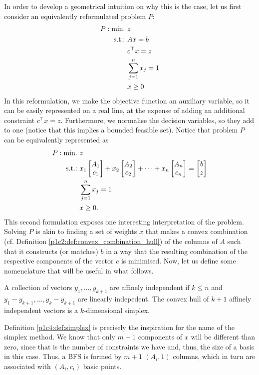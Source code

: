 In order to develop a geometrical intuition on why this is the case, let us first consider an equivalently reformulated problem $P$:
%
\begin{align*}
	P : \mathop{\text{min.~}} & z           \\
	\mathop{\text{s.t.:~}} & Ax = b        \\
	& c^\top x = z      \\	
	& \sum_{j=1}^nx_j=1 \\
	& x \geq 0
\end{align*}
% 
In this reformulation, we make the objective function an auxiliary variable, so it can be easily represented on a real line, at the expense of adding an additional constraint $c^\top x = z$. Furthermore, we normalise the decision variables, so they add to one (notice that this implies a bounded feasible set). Notice that problem $P$ can be equivalently represented as  
%
\begin{align*}
	P : \mathop{\text{min.~}} & z     \\
	\mathop{\text{s.t.:~}} & x_1\begin{bmatrix}
		A_1 \\
		c_1
	\end{bmatrix} + x_2\begin{bmatrix}
		A_2 \\
		c_2
	\end{bmatrix} + \dots +
	x_n\begin{bmatrix}
		A_n \\
		c_n
	\end{bmatrix} = \begin{bmatrix}
		b \\
		z
	\end{bmatrix}\\
	& \sum_{j=1}^nx_j=1 \\
	& x \geq 0.
\end{align*}
% 
This second formulation exposes one interesting interpretation of the problem. Solving $P$ is akin to finding a set of weights $x$ that makes a convex combination (cf. Definition \ref{p1c2:def:convex_combination_hull}) of the columns of $A$ such that it constructs (or matches) $b$ in a way that the resulting combination of the respective components of the vector $c$ is minimised. Now, let us define some nomenclature that will be useful in what follows.
%
\begin{definition} \label{p1c4:def:simplex}
	A collection of vectors $y_1, \dots, y_{k+1}$ are affinely independent if $k \leq n$ and $y_1 - y_{k+1}, \dots, y_{k} - y_{k+1}$ are linearly indepedent. The convex hull of $k+1$ affinely independent vectors is a $k$-dimensional simplex.
\end{definition}
%
Definition \ref{p1c4:def:simplex} is precisely the inspiration for the name of the simplex method. We know that only $m+1$ components of $x$ will be different than zero, since that is the number of constraints we have and, thus, the size of a basis in this case. Thus, a BFS is formed by $m+1$ $(A_i, 1)$ columns, which in turn are associated with $(A_i,c_i)$ basic points. 

